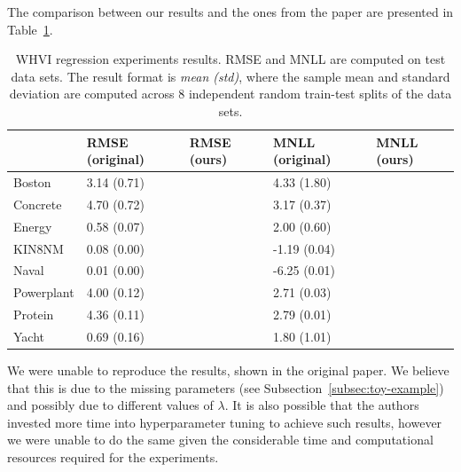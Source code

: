 The comparison between our results and the ones from the paper are presented in Table~\ref{tab:regression-experiments}.
\begin{table}[]
    \begin{tabular}{l|llll}
               & RMSE (original) & RMSE (ours) & { }MNLL (original) & MNLL (ours) \\ \hline
    Boston     & 3.14 (0.71)     &             & { }4.33 (1.80)     &             \\
    Concrete   & 4.70 (0.72)     &             & { }3.17 (0.37)     &             \\
    Energy     & 0.58 (0.07)     &             & { }2.00 (0.60)     &             \\
    KIN8NM     & 0.08 (0.00)     &             & -1.19 (0.04)       &             \\
    Naval      & 0.01 (0.00)     &             & -6.25 (0.01)       &             \\
    Powerplant & 4.00 (0.12)     &             & { }2.71 (0.03)     &             \\
    Protein    & 4.36 (0.11)     &             & { }2.79 (0.01)     &             \\
    Yacht      & 0.69 (0.16)     &             & { }1.80 (1.01)     &
    \end{tabular}
    \caption{WHVI regression experiments results. RMSE and MNLL are computed on test data sets. The result format is \textit{mean (std)}, where the sample mean and standard deviation are computed across 8 independent random train-test splits of the data sets.}
    \label{tab:regression-experiments}
\end{table}
We were unable to reproduce the results, shown in the original paper.
We believe that this is due to the missing parameters (see Subsection~\ref{subsec:toy-example}) and possibly due to different values of $\lambda$.
It is also possible that the authors invested more time into hyperparameter tuning to achieve such results, however we were unable to do the same given the considerable time and computational resources required for the experiments.
